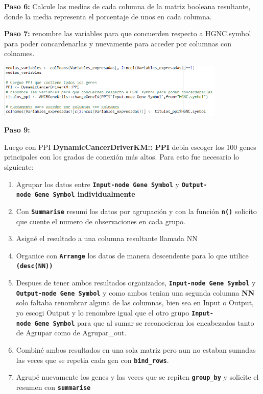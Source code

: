 \documentclass[
]{article}
\providecommand{\tightlist}{%
  \setlength{\itemsep}{0pt}\setlength{\parskip}{0pt}}
\begin{document}
\textbf{Paso 6:} Calcule las medias de cada columna de la matriz
booleana resultante, donde la media representa el porcentaje de unos en
cada columna.

\textbf{Paso 7:} renombre las variables para que concuerden respecto a
HGNC.symbol para poder concardenarlas y nuevamente para acceder por
columnas con colnames.

\includegraphics[width=4.29167in,height=\textheight]{images/MEDIAS.png}

\textbf{Paso 9:}

Luego con PPI \textbf{DynamicCancerDriverKM:: PPI} debia escoger los 100
genes principales con los grados de conexión más altos. Para esto fue
necesario lo siguiente:

\begin{enumerate}
\def\labelenumi{\arabic{enumi}.}
\tightlist
\item
  Agrupar los datos entre \textbf{\texttt{Input-node\ Gene\ Symbol}} y
  \textbf{\texttt{Output-node\ Gene\ Symbol} individualmente}
\item
  Con \textbf{\texttt{Summarise}} resumi los datos por agrupación y con
  la función \textbf{\texttt{n()}} solicito que cuente el numero de
  observaciones en cada grupo.
\item
  Asigné el resultado a una columna resultante llamada NN
\item
  Organice con \textbf{\texttt{Arrange}} los datos de manera descendente
  para lo que utilice \textbf{\texttt{(desc(NN))}}
\item
  Despues de tener ambos resultados organizados,
  \textbf{\texttt{Input-node\ Gene\ Symbol}} y
  \textbf{\texttt{Output-node\ Gene\ Symbol}} y como ambos tenian una
  segunda columna \textbf{NN} solo faltaba renombrar alguna de las
  columnas, bien sea en Input o Output, yo escogi Output y lo renombre
  igual que el otro grupo \textbf{\texttt{Input-node\ Gene\ Symbol}}
  para que al sumar se reconocieran los encabezados tanto de Agrupar
  como de Agrupar\_out.
\item
  Combiné ambos resultados en una sola matriz pero aun no estaban
  sumadas las veces que se repetia cada gen con
  \textbf{\texttt{bind\_rows}}.
\item
  Agrupé nuevamente los genes y las veces que se repiten
  \textbf{\texttt{group\_by}} y solicite el resumen con
  \textbf{\texttt{summarise}}
\end{enumerate}
\end{document}
